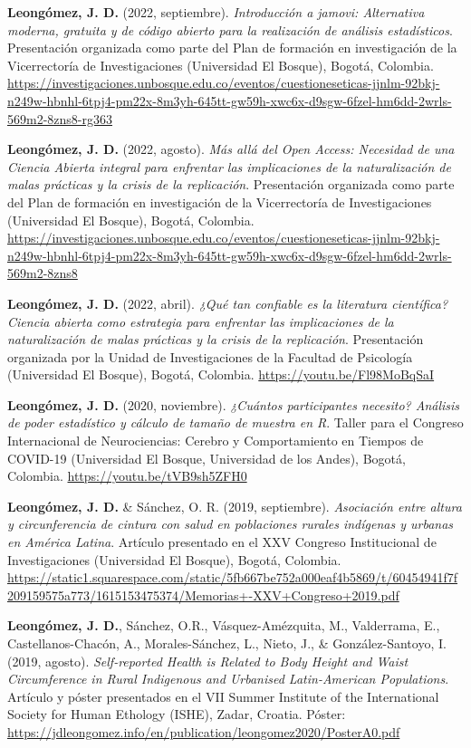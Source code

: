 \documentclass[11pt,a4paper,]{awesome-cv}
\begin{document}
\textbf{Leongómez, J. D.} (2022, septiembre). \emph{Introducción a
jamovi: Alternativa moderna, gratuita y de código abierto para la
realización de análisis estadísticos}. Presentación organizada como
parte del Plan de formación en investigación de la Vicerrectoría de
Investigaciones (Universidad El Bosque), Bogotá, Colombia.
\url{https://investigaciones.unbosque.edu.co/eventos/cuestioneseticas-jjnlm-92bkj-n249w-hbnhl-6tpj4-pm22x-8m3yh-645tt-gw59h-xwc6x-d9sgw-6fzel-hm6dd-2wrls-569m2-8zns8-rg363}

\textbf{Leongómez, J. D.} (2022, agosto). \emph{Más allá del Open
Access: Necesidad de una Ciencia Abierta integral para enfrentar las
implicaciones de la naturalización de malas prácticas y la crisis de la
replicación}. Presentación organizada como parte del Plan de formación
en investigación de la Vicerrectoría de Investigaciones (Universidad El
Bosque), Bogotá, Colombia.
\url{https://investigaciones.unbosque.edu.co/eventos/cuestioneseticas-jjnlm-92bkj-n249w-hbnhl-6tpj4-pm22x-8m3yh-645tt-gw59h-xwc6x-d9sgw-6fzel-hm6dd-2wrls-569m2-8zns8}

\textbf{Leongómez, J. D.} (2022, abril). \emph{¿Qué tan confiable es la
literatura científica? Ciencia abierta como estrategia para enfrentar
las implicaciones de la naturalización de malas prácticas y la crisis de
la replicación}. Presentación organizada por la Unidad de
Investigaciones de la Facultad de Psicología (Universidad El Bosque),
Bogotá, Colombia. \url{https://youtu.be/Fl98MoBqSaI}

\textbf{Leongómez, J. D.} (2020, noviembre). \emph{¿Cuántos
participantes necesito? Análisis de poder estadístico y cálculo de
tamaño de muestra en R}. Taller para el Congreso Internacional de
Neurociencias: Cerebro y Comportamiento en Tiempos de COVID-19
(Universidad El Bosque, Universidad de los Andes), Bogotá, Colombia.
\url{https://youtu.be/tVB9sh5ZFH0}

\textbf{Leongómez, J. D.} \& Sánchez, O. R. (2019, septiembre).
\emph{Asociación entre altura y circunferencia de cintura con salud en
poblaciones rurales indígenas y urbanas en América Latina}. Artículo
presentado en el XXV Congreso Institucional de Investigaciones
(Universidad El Bosque), Bogotá, Colombia.
\url{https://static1.squarespace.com/static/5fb667be752a000eaf4b5869/t/60454941f7f209159575a773/1615153475374/Memorias+-XXV+Congreso+2019.pdf}

\textbf{Leongómez, J. D.}, Sánchez, O.R., Vásquez-Amézquita, M.,
Valderrama, E., Castellanos-Chacón, A., Morales-Sánchez, L., Nieto, J.,
\& González-Santoyo, I. (2019, agosto). \emph{Self-reported Health is
Related to Body Height and Waist Circumference in Rural Indigenous and
Urbanised Latin-American Populations}. Artículo y póster presentados en
el VII Summer Institute of the International Society for Human Ethology
(ISHE), Zadar, Croatia. Póster:
\url{https://jdleongomez.info/en/publication/leongomez2020/PosterA0.pdf}
\end{document}
